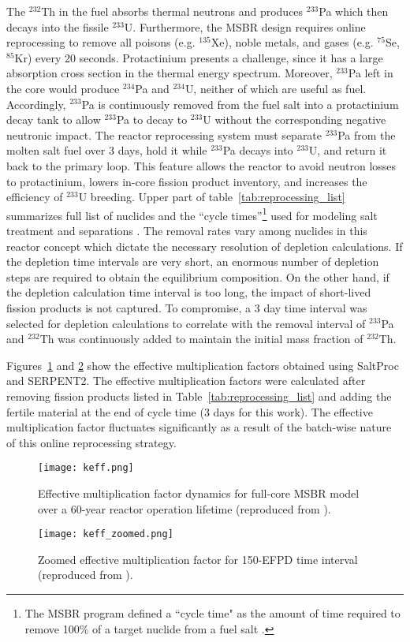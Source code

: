 The $^{232}$Th in the fuel absorbs thermal neutrons and produces $^{233}$Pa 
which then decays into the fissile $^{233}$U. Furthermore, the \gls{MSBR} 
design requires online reprocessing to remove all poisons (e.g. $^{135}$Xe), 
noble metals, and gases (e.g. $^{75}$Se, $^{85}$Kr) every 20 seconds. 
Protactinium presents a challenge, since it has a large absorption cross 
section in the thermal energy spectrum. Moreover, $^{233}$Pa left in the core
would produce $^{234}$Pa and $^{234}$U, neither of which are useful as fuel. 
Accordingly, $^{233}$Pa is continuously 
removed from the fuel salt into a protactinium decay tank to allow $^{233}$Pa 
to decay to $^{233}$U without the corresponding negative neutronic impact. The reactor 
reprocessing system must separate $^{233}$Pa from the molten salt fuel over 3 
days, hold it while $^{233}$Pa decays into $^{233}$U, and return it back to the 
primary loop. This feature allows the reactor to avoid neutron losses to 
protactinium, lowers in-core fission product inventory, and increases the 
efficiency of $^{233}$U breeding. Upper part of table~\ref{tab:reprocessing_list} 
summarizes full list of nuclides and the ``cycle times''\footnote{ The \gls{MSBR} 
program defined a ``cycle time" as the amount of time required to remove 100\% of 
a target nuclide from a fuel 
salt \cite{robertson_conceptual_1971}.} used for modeling salt treatment and 
separations \cite{robertson_conceptual_1971}. 
The removal rates vary among nuclides in this reactor concept which dictate the 
necessary resolution of depletion calculations. If the depletion time intervals 
are very short, an enormous number of depletion steps are required to obtain 
the equilibrium composition. On the other hand, if the depletion  calculation 
time interval is too long, the impact of short-lived fission products is not 
captured. To compromise, a 3 day time interval was selected for depletion 
calculations to correlate with the removal interval of 
$^{233}$Pa and $^{232}$Th was continuously added to maintain the initial mass 
fraction of $^{232}$Th.

Figures~\ref{fig:keff} and \ref{fig:keff_zoomed} show the effective multiplication factors 
obtained using SaltProc and SERPENT2. The effective multiplication factors were 
calculated after removing fission products listed in 
Table~\ref{tab:reprocessing_list} and adding the fertile material at the end of 
cycle time (3 days for this work). The effective multiplication 
factor fluctuates significantly as a result of the batch-wise nature of this 
online reprocessing strategy. 
\begin{figure}[ht!] 
  \centering
  \texttt{[image: keff.png]}
  \caption{Effective multiplication factor dynamics for full-core \gls{MSBR} 
  model over a 60-year reactor operation lifetime (reproduced from 
  \cite{rykhlevskii_modeling_2019}).}
  \label{fig:keff}
\end{figure}
\begin{figure}[ht!] 
  \centering
  \texttt{[image: keff\_zoomed.png]}
  \caption{Zoomed effective multiplication factor for 150-EFPD time interval 
  (reproduced from \cite{rykhlevskii_modeling_2019}).}
  \label{fig:keff_zoomed}
\end{figure}

